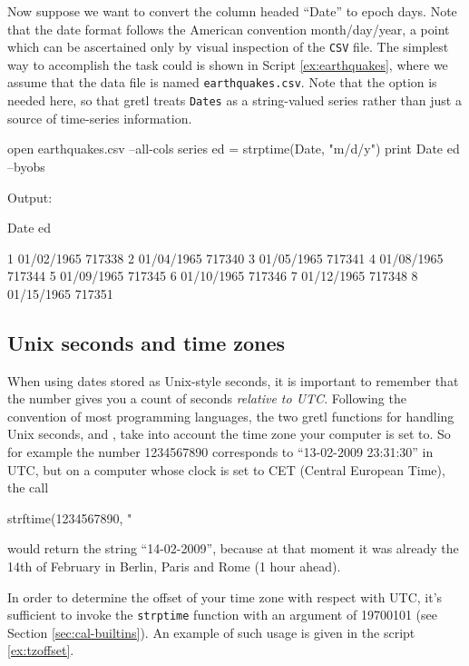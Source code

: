 Now suppose we want to convert the column headed ``Date'' to epoch
days. Note that the date format follows the American convention
month/day/year, a point which can be ascertained only by visual
inspection of the \texttt{CSV} file. The simplest way to accomplish
the task could is shown in Script \ref{ex:earthquakes}, where we
assume that the data file is named \texttt{earthquakes.csv}. Note that
the  option is needed here, so that gretl treats
\texttt{Dates} as a string-valued series rather than just a source
of time-series information.

\begin{script}[htbp]
  \label{ex:earthquakes}
\begin{scodebit}
open earthquakes.csv --all-cols
series ed = strptime(Date, "m/d/y")
print Date ed --byobs
\end{scodebit}
  
Output:
\begin{outbit}
          Date           ed

1   01/02/1965       717338
2   01/04/1965       717340
3   01/05/1965       717341
4   01/08/1965       717344
5   01/09/1965       717345
6   01/10/1965       717346
7   01/12/1965       717348
8   01/15/1965       717351
\end{outbit}
\end{script}

\subsection{Unix seconds and time zones}

When using dates stored as Unix-style seconds, it is important to
remember that the number gives you a count of seconds \emph{relative
  to UTC}. Following the convention of most programming languages, the
two gretl functions for handling Unix seconds,  and
, take into account the time zone your computer is set
to. So for example the number 1234567890 corresponds to ``13-02-2009
23:31:30'' in UTC, but on a computer whose clock is set to CET
(Central European Time), the call
\begin{code}
  strftime(1234567890, "%
\end{code}
would return the string ``14-02-2009'', because at that moment it was
already the 14th of February in Berlin, Paris and Rome (1 hour ahead).

In order to determine the offset of your time zone with respect with
UTC, it's sufficient to invoke the \texttt{strptime} function with an
argument of 19700101 (see Section \ref{sec:cal-builtins}).  An example
of such usage is given in the script \ref{ex:tzoffset}.

